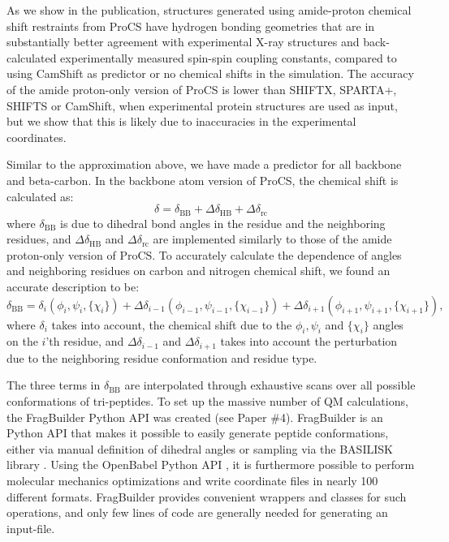 As we show in the publication, structures generated using amide-proton chemical shift restraints from ProCS have hydrogen bonding geometries that are in substantially better agreement with experimental X-ray structures and back-calculated experimentally measured spin-spin coupling constants, compared to using CamShift as predictor or no chemical shifts in the simulation.
The accuracy of the amide proton-only version of ProCS is lower than SHIFTX, SPARTA+, SHIFTS or CamShift, when experimental protein structures are used as input, but we show that this is likely due to inaccuracies in the experimental coordinates.%

Similar to the approximation above, we have made a predictor for all backbone and beta-carbon.
In the backbone atom version of ProCS, the chemical shift is calculated as:
\begin{equation}
    \delta = \delta_\mathrm{BB} + \Delta\delta_\mathrm{HB} + \Delta\delta_\mathrm{rc}
\end{equation}
where $\delta_\mathrm{BB}$ is due to dihedral bond angles in the residue and the neighboring residues, and $\Delta\delta_\mathrm{HB}$ and $\Delta\delta_\mathrm{rc}$ are implemented similarly to those of the amide proton-only version of ProCS.
To accurately calculate the dependence of angles and neighboring residues on carbon and nitrogen chemical shift, we found an accurate description to be:
\begin{equation}
    \delta_\mathrm{BB} = \delta_{i}(\phi_i,\psi_i, \{\chi_i\})
    + \Delta\delta_{i-1}(\phi_{i-1},\psi_{i-1}, \{\chi_{i-1}\})
    + \Delta\delta_{i+1}(\phi_{i+1},\psi_{i+1}, \{\chi_{i+1}\}),
\end{equation}
where $\delta_{i}$ takes into account, the chemical shift due to the $\phi_i,\psi_i$ and $\{\chi_i\}$ angles on the $i$'th residue, and $\Delta\delta_{i-1}$ and $\Delta\delta_{i+1}$ takes into account the perturbation due to the neighboring residue conformation and residue type.

The three terms in $\delta_\mathrm{BB}$ are interpolated through exhaustive scans over all possible conformations of tri-peptides.
To set up the massive number of QM calculations, the FragBuilder Python API was created (see Paper \#4).
FragBuilder is an Python API that makes it possible to easily generate peptide conformations, either via manual definition of dihedral angles or sampling via the BASILISK library \cite{BASILISK}. 
Using the OpenBabel Python API \cite{Babel}, it is furthermore possible to perform molecular mechanics optimizations and write coordinate files in nearly 100 different formats.
FragBuilder provides convenient wrappers and classes for such operations, and only few lines of code are generally needed for generating an input-file.


